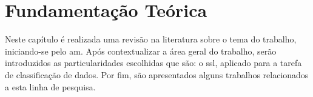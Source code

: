 


\chapter{Fundamentação Teórica}
    \label{cha:fundamentacao-teorica}

    Neste capítulo é realizada uma revisão na literatura sobre o tema do trabalho, iniciando\hyp{se} pelo \ac{am}. Após contextualizar a área geral do trabalho, serão introduzidos as particularidades escolhidas que são: o \ac{ssl}, aplicado para a tarefa de classificação de dados. Por fim, são apresentados alguns trabalhos relacionados a esta linha de pesquisa.

    
    
    
    
    
    
    
